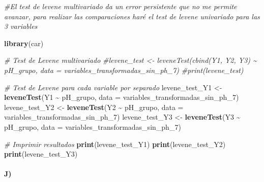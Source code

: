 \documentclass[
]{article}
\newenvironment{Shaded}{\begin{snugshade}}{\end{snugshade}}
\newcommand{\AttributeTok}[1]{\textcolor[rgb]{0.13,0.29,0.53}{#1}}
\newcommand{\CommentTok}[1]{\textcolor[rgb]{0.56,0.35,0.01}{\textit{#1}}}
\newcommand{\FunctionTok}[1]{\textcolor[rgb]{0.13,0.29,0.53}{\textbf{#1}}}
\newcommand{\NormalTok}[1]{#1}
\newcommand{\OtherTok}[1]{\textcolor[rgb]{0.56,0.35,0.01}{#1}}
\newcommand{\SpecialCharTok}[1]{\textcolor[rgb]{0.81,0.36,0.00}{\textbf{#1}}}
\begin{document}
\begin{Shaded}
\begin{Highlighting}[]
\CommentTok{\#El test de levene multivariado da un error persistente que no me permite avanzar, para realizar las comparaciones haré el test de levene univariado para las 3 variables}

\FunctionTok{library}\NormalTok{(car)}

\CommentTok{\# Test de Levene multivariado}
\CommentTok{\#levene\_test \textless{}{-} leveneTest(cbind(Y1, Y2, Y3) \textasciitilde{} pH\_grupo, data = variables\_transformadas\_sin\_ph\_7)}
\CommentTok{\#print(levene\_test)}



\CommentTok{\# Test de Levene para cada variable por separado}
\NormalTok{levene\_test\_Y1 }\OtherTok{\textless{}{-}} \FunctionTok{leveneTest}\NormalTok{(Y1 }\SpecialCharTok{\textasciitilde{}}\NormalTok{ pH\_grupo, }\AttributeTok{data =}\NormalTok{ variables\_transformadas\_sin\_ph\_7)}
\NormalTok{levene\_test\_Y2 }\OtherTok{\textless{}{-}} \FunctionTok{leveneTest}\NormalTok{(Y2 }\SpecialCharTok{\textasciitilde{}}\NormalTok{ pH\_grupo, }\AttributeTok{data =}\NormalTok{ variables\_transformadas\_sin\_ph\_7)}
\NormalTok{levene\_test\_Y3 }\OtherTok{\textless{}{-}} \FunctionTok{leveneTest}\NormalTok{(Y3 }\SpecialCharTok{\textasciitilde{}}\NormalTok{ pH\_grupo, }\AttributeTok{data =}\NormalTok{ variables\_transformadas\_sin\_ph\_7)}

\CommentTok{\# Imprimir resultados}
\FunctionTok{print}\NormalTok{(levene\_test\_Y1)}
\FunctionTok{print}\NormalTok{(levene\_test\_Y2)}
\FunctionTok{print}\NormalTok{(levene\_test\_Y3)}
\end{Highlighting}
\end{Shaded}

\hypertarget{j-1}{%
\paragraph{J)}\label{j-1}}
\end{document}
